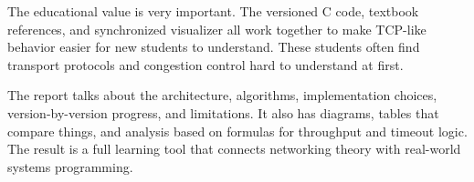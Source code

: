 \begin{doublespacing}
The educational value is very important. The versioned C code, textbook
references, and synchronized visualizer all work together to make TCP-like
behavior easier for new students to understand. These students often find
transport protocols and congestion control hard to understand at first.

The report talks about the architecture, algorithms, implementation choices,
version-by-version progress, and limitations. It also has diagrams, tables that
compare things, and analysis based on formulas for throughput and timeout
logic. The result is a full learning tool that connects networking theory with
real-world systems programming.
\end{doublespacing}
